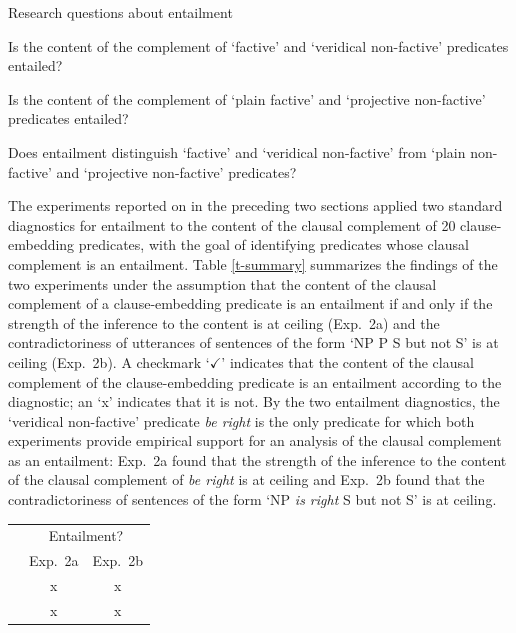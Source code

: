 \documentclass[11pt,fleqn]{article}
\newcommand{\6}{\mbox{$[\hspace*{-.6mm}[$}}
\newcommand{\9}{\mbox{$]\hspace*{-.6mm}]$}}
\begin{document}
{\begin{exe}
\exi{(\ref{erq})} Research questions about entailment
\begin{xlist}
\ex Is the content of the complement of `factive' and `veridical non-factive' predicates entailed?

\ex Is the content of the complement of `plain factive' and `projective non-factive' predicates entailed?

\ex Does entailment distinguish `factive' and `veridical non-factive' from `plain non-factive' and `projective non-factive' predicates?
\end{xlist}
\end{exe}

The experiments reported on in the preceding two sections applied two standard diagnostics for entailment to the content of the clausal complement of 20 clause-embedding predicates, with the goal of identifying predicates whose clausal complement is an entailment. Table \ref{t-summary} summarizes the findings of the two experiments under the assumption that the content of the clausal complement of a clause-embedding predicate is an entailment if and only if the strength of the inference to the content is at ceiling (Exp.~2a) and the contradictoriness of utterances of sentences of the form `NP P S but not S' is at ceiling (Exp.~2b). A checkmark `$\checkmark$' indicates that the content of the clausal complement of the clause-embedding predicate is an entailment according to the diagnostic; an `x' indicates that it is not. By the two entailment diagnostics, the `veridical non-factive' predicate {\em be right} is the only predicate for which both experiments provide empirical support for an analysis of the clausal complement as an entailment: Exp.~2a found that the strength of the inference to the content of the clausal complement of {\em be right} is at ceiling and Exp.~2b found that the contradictoriness of sentences of the form `NP {\em is right} S but not S' is at ceiling. 



\begin{table}[h!]
\setlength\tabcolsep{3pt}

\centering
\small

\begin{tabular}{l c c}
\toprule
& \multicolumn{2}{c}{Entailment?} \\ 
& Exp.~2a & Exp.~2b \\ 

\midrule
\color{brown}{\em think}\color{black}		&  x &   x  \\ 
\color{brown}{\em pretend}\color{black}	&    x  &   x  \\ 


\end{tabular}
\end{table}}
\end{document}
